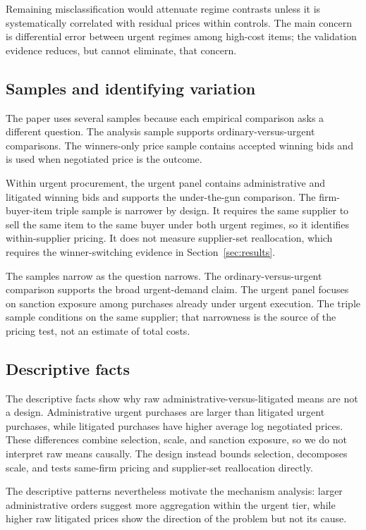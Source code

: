 Remaining misclassification would attenuate regime contrasts unless it
is systematically correlated with residual prices within controls. The
main concern is differential error between urgent regimes among
high-cost items; the validation evidence reduces, but cannot eliminate,
that concern.

\subsection{Samples and identifying variation}
\label{subsec:samples}

The paper uses several samples because each empirical comparison asks
a different question. The analysis sample supports
ordinary-versus-urgent comparisons. The winners-only price sample
contains \BPnegNobs{} accepted winning bids and is used when negotiated
price is the outcome.

Within urgent procurement, the urgent panel contains administrative
and litigated winning bids and supports the under-the-gun comparison.
The firm-buyer-item triple sample is narrower by design. It requires
the same supplier to sell the same item to the same buyer under both
urgent regimes, so it identifies within-supplier pricing. It does not
measure supplier-set reallocation, which requires the winner-switching
evidence in Section~\ref{sec:results}.

The samples narrow as the question narrows. The
ordinary-versus-urgent comparison supports the broad urgent-demand
claim. The urgent panel focuses on sanction exposure among purchases
already under urgent execution. The triple sample conditions on the
same supplier; that narrowness is the source of the pricing test, not
an estimate of total costs.

\subsection{Descriptive facts}
\label{subsec:descriptives}

The descriptive facts show why raw administrative-versus-litigated means are not a design. Administrative urgent purchases are larger than litigated urgent purchases, while litigated purchases have higher average log negotiated prices. These differences combine selection, scale, and sanction exposure, so we do not interpret raw means causally. The design instead bounds selection, decomposes scale, and tests same-firm pricing and supplier-set reallocation directly.

The descriptive patterns nevertheless motivate the mechanism analysis:
larger administrative orders suggest more aggregation within the
urgent tier, while higher raw litigated prices show the direction of
the problem but not its cause.
